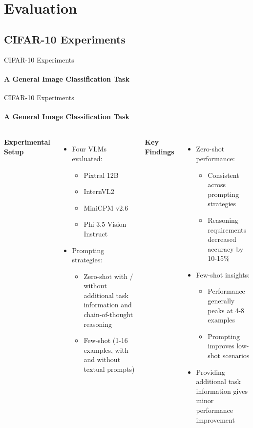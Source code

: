 \section{Evaluation}
\subsection{CIFAR-10 Experiments}
\begin{frame}{CIFAR-10 Experiments}
\framesubtitle{A General Image Classification Task}
  \vspace{-1em}
  \CifarDatasetSlide
\end{frame}


\begin{frame}{CIFAR-10 Experiments}
\framesubtitle{A General Image Classification Task}
  \vspace{-1em}
  \begin{columns}[T]
    \column{\customcolumnwidth}
      \textbf{Experimental Setup}
      \begin{itemize}
        \item Four VLMs evaluated:
        \begin{itemize}
          \item Pixtral 12B
          \item InternVL2
          \item MiniCPM v2.6
          \item Phi-3.5 Vision Instruct
        \end{itemize}
        \item Prompting strategies:
        \begin{itemize}
          \item Zero-shot with / without additional task information and chain-of-thought reasoning
          \item Few-shot (1-16 examples, with and without textual prompts)
        \end{itemize}
      \end{itemize}
    \column{\customcolumnwidth}
      \textbf{Key Findings}
      \begin{itemize}
        \item Zero-shot performance:
        \begin{itemize}
          \item Consistent across prompting strategies
          \item Reasoning requirements decreased accuracy by 10-15\%
        \end{itemize}
        \item Few-shot insights:
        \begin{itemize}
          \item Performance generally peaks at 4-8 examples
          \item Prompting improves low-shot scenarios
        \end{itemize}
        \item Providing additional task information gives minor performance improvement
      \end{itemize}
  \end{columns}
\end{frame}
